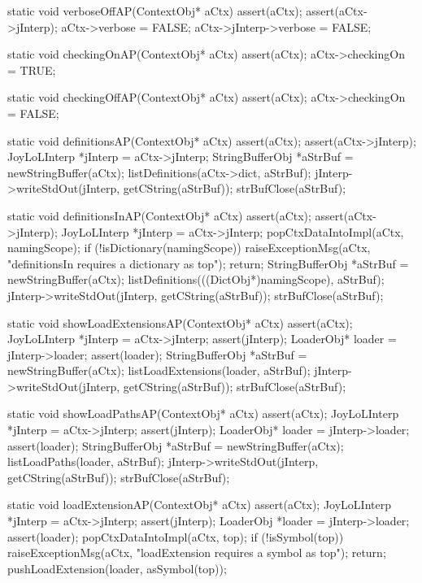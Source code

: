 \startCCode
static void verboseOffAP(ContextObj* aCtx) {
  assert(aCtx);
  assert(aCtx->jInterp);
  aCtx->verbose = FALSE;
  aCtx->jInterp->verbose = FALSE;
}
\stopCCode

\startCCode
static void checkingOnAP(ContextObj* aCtx) {
  assert(aCtx);
  aCtx->checkingOn = TRUE;
}
\stopCCode

\startCCode
static void checkingOffAP(ContextObj* aCtx) {
  assert(aCtx);
  aCtx->checkingOn = FALSE;
}
\stopCCode

\startCCode
static void definitionsAP(ContextObj* aCtx) {
  assert(aCtx);
  assert(aCtx->jInterp);
  JoyLoLInterp *jInterp = aCtx->jInterp;
  StringBufferObj *aStrBuf = newStringBuffer(aCtx);
  listDefinitions(aCtx->dict, aStrBuf);
  jInterp->writeStdOut(jInterp, getCString(aStrBuf));
  strBufClose(aStrBuf);
}
\stopCCode

\startCCode
static void definitionsInAP(ContextObj* aCtx) {
  assert(aCtx);
  assert(aCtx->jInterp);
  JoyLoLInterp *jInterp = aCtx->jInterp;
  popCtxDataIntoImpl(aCtx, namingScope);
  if (!isDictionary(namingScope)) {
    raiseExceptionMsg(aCtx,
      "definitionsIn requires a dictionary as top");
    return;
  }
  StringBufferObj *aStrBuf = newStringBuffer(aCtx);
  listDefinitions(((DictObj*)namingScope), aStrBuf);
  jInterp->writeStdOut(jInterp, getCString(aStrBuf));
  strBufClose(aStrBuf);
}
\stopCCode

\startCCode
static void showLoadExtensionsAP(ContextObj* aCtx) {
  assert(aCtx);
  JoyLoLInterp *jInterp = aCtx->jInterp;
  assert(jInterp);
  LoaderObj* loader = jInterp->loader;
  assert(loader);
  StringBufferObj *aStrBuf = newStringBuffer(aCtx);
  listLoadExtensions(loader, aStrBuf);
  jInterp->writeStdOut(jInterp, getCString(aStrBuf));
  strBufClose(aStrBuf);
}
\stopCCode

\startCCode
static void showLoadPathsAP(ContextObj* aCtx) {
  assert(aCtx);
  JoyLoLInterp *jInterp = aCtx->jInterp;
  assert(jInterp);
  LoaderObj* loader = jInterp->loader;
  assert(loader);
  StringBufferObj *aStrBuf = newStringBuffer(aCtx);
  listLoadPaths(loader, aStrBuf);
  jInterp->writeStdOut(jInterp, getCString(aStrBuf));
  strBufClose(aStrBuf);
}
\stopCCode

\startCCode
static void loadExtensionAP(ContextObj* aCtx) {
  assert(aCtx);
  JoyLoLInterp *jInterp = aCtx->jInterp;
  assert(jInterp);
  LoaderObj *loader = jInterp->loader;
  assert(loader);
  popCtxDataIntoImpl(aCtx, top);
  if (!isSymbol(top)) {
    raiseExceptionMsg(aCtx,
      "loadExtension requires a symbol as top");
    return;
  }
  pushLoadExtension(loader, asSymbol(top));
}
\stopCCode


